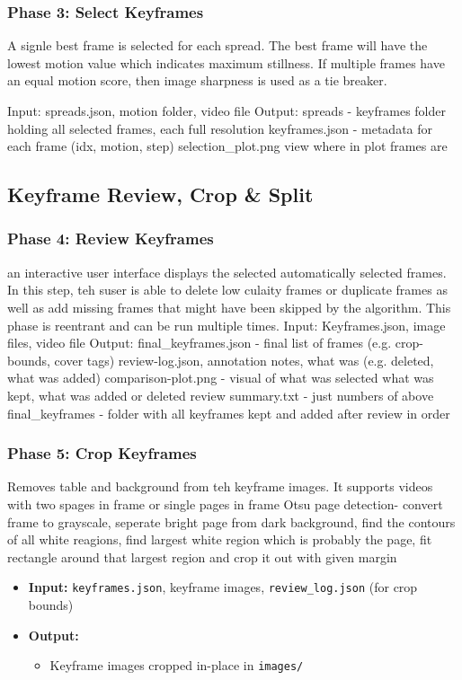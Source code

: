 \subsubsection{Phase 3: Select Keyframes}
A signle best frame is selected for each spread. The best frame will have the lowest motion value which indicates maximum stillness. If multiple frames have an equal motion score, then image sharpness is used as a tie breaker. 

Input: spreads.json, motion folder, video file
Output:
    spreads - keyframes folder holding all selected frames, each full resolution
    keyframes.json - metadata for each frame (idx, motion, step)
    selection\_plot.png view where in plot frames are


\subsection{Keyframe Review, Crop \& Split}

\subsubsection{Phase 4: Review Keyframes}
an interactive user interface displays the selected automatically selected frames. In this step, teh suser is able to delete low culaity frames or duplicate frames as well as add missing frames that might have been skipped by the algorithm. This phase is reentrant and can be run multiple times. 
Input: Keyframes.json, image files, video file
Output:
final\_keyframes.json - final list of frames
    (e.g. crop-bounds, cover tags)
review-log.json, annotation notes, what was
    (e.g. deleted, what was added)
comparison-plot.png - visual of what was selected
    what was kept, what was added or deleted
review summary.txt - just numbers of above
final\_keyframes - folder with all keyframes kept
    and added after review in order

\subsubsection{Phase 5: Crop Keyframes}
Removes table and background from teh keyframe images. It supports videos with two spages in frame or single pages in frame
Otsu page detection- convert frame to grayscale, seperate bright page from dark background, find the contours of all white reagions, find largest white region which is probably the page, fit rectangle around that largest region and crop it out with given margin
\begin{itemize}
    \item \textbf{Input:} \texttt{keyframes.json}, keyframe images, \texttt{review\_log.json} (for crop bounds)
    \item \textbf{Output:}
    \begin{itemize}
        \item Keyframe images cropped in-place in \texttt{images/}
    \end{itemize}
\end{itemize}


